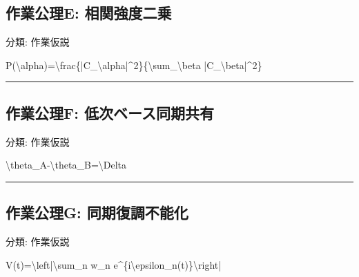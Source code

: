 \documentclass[
  a4paper,
]{ltjsarticle}
\newenvironment{Shaded}{}{}
\newcommand{\NormalTok}[1]{#1}
\begin{document}
\subsection{作業公理E:
相関強度二乗}\label{ux4f5cux696dux516cux7406e-ux76f8ux95a2ux5f37ux5ea6ux4e8cux4e57}

分類: 作業仮説

\begin{Shaded}
\begin{Highlighting}[]
\NormalTok{P(\textbackslash{}alpha)=\textbackslash{}frac\{|C\_\textbackslash{}alpha|\^{}2\}\{\textbackslash{}sum\_\textbackslash{}beta |C\_\textbackslash{}beta|\^{}2\}}
\end{Highlighting}
\end{Shaded}

\begin{center}\rule{0.5\linewidth}{0.5pt}\end{center}

\subsection{作業公理F:
低次ベース同期共有}\label{ux4f5cux696dux516cux7406f-ux4f4eux6b21ux30d9ux30fcux30b9ux540cux671fux5171ux6709}

分類: 作業仮説

\begin{Shaded}
\begin{Highlighting}[]
\NormalTok{\textbackslash{}theta\_A{-}\textbackslash{}theta\_B=\textbackslash{}Delta}
\end{Highlighting}
\end{Shaded}

\begin{center}\rule{0.5\linewidth}{0.5pt}\end{center}

\subsection{作業公理G:
同期復調不能化}\label{ux4f5cux696dux516cux7406g-ux540cux671fux5fa9ux8abfux4e0dux80fdux5316}

分類: 作業仮説

\begin{Shaded}
\begin{Highlighting}[]
\NormalTok{V(t)=\textbackslash{}left|\textbackslash{}sum\_n w\_n e\^{}\{i\textbackslash{}epsilon\_n(t)\}\textbackslash{}right|}
\end{Highlighting}
\end{Shaded}
\end{document}
